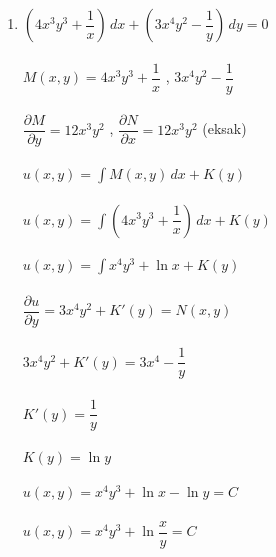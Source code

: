 \begin{enumerate}[1.]
	\item \begin{math} (4x^{3}y^{3} + \dfrac{1}{x}) \, dx + (3x^{4}y^{2} - \dfrac{1}{y}) \, dy = 0 \end{math} \\ \\
		\begin{math} M(x, y) = 4x^{3}y^{3} + \dfrac{1}{x} \end{math} , \begin{math} 3x^{4}y^{2} - \dfrac{1}{y} \end{math} \\ \\
		\begin{math} \dfrac{\partial M}{\partial y} = 12x^{3}y^{2} \end{math} , \begin{math} \dfrac{\partial N}{\partial x} = 12x^{3}y^{2} \end{math} (eksak) \\ \\
		\begin{math} u(x, y) = \int M(x, y) \, dx + K(y) \end{math} \\ \\
		\begin{math} u(x, y) = \int (4x^{3}y^{3} + \dfrac{1}{x}) \, dx + K(y) \end{math} \\ \\
		\begin{math} u(x, y) = \int x^{4}y^{3} + \ln x + K(y) \end{math} \\ \\
		\begin{math} \dfrac{\partial u}{\partial y} = 3x^{4}y^{2} + K'(y) = N(x, y) \end{math} \\ \\
		\begin{math} 3x^{4}y^{2} + K'(y) = 3x^{4} - \dfrac{1}{y}  \end{math} \\ \\
		\begin{math} K'(y) = \dfrac{1}{y} \end{math} \\ \\
		\begin{math} K(y) = \ln y \end{math} \\ \\
		\begin{math} u(x, y) = x^{4}y^{3} + \ln x - \ln y = C \end{math} \\ \\
		\begin{math} u(x, y) = x^{4}y^{3} + \ln \dfrac{x}{y} = C \end{math} 

\end{enumerate}

